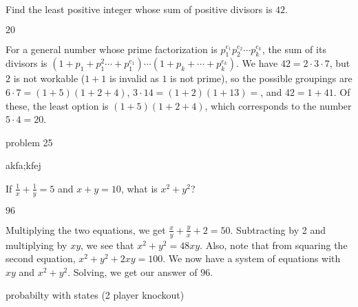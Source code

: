 \documentclass[11pt]{article}
\begin{document}
\begin{problem}
Find the least positive integer whose sum of positive divisors is $42$.
\end{problem}

\begin{answer}
$\boxed{20}$
\end{answer}

\begin{solution}
For a general number whose prime factorization is $p_1^{e_1}p_2^{e_2} \cdots p_k^{e_k}$, the sum of its divisors is $(1 + p_1 + p_1^2 \cdots + p_1^{e_1}) \cdots (1 + p_k + \cdots + p_k^{e_k})$. We have $42 = 2 \cdot 3 \cdot 7$, but $2$ is not workable ($1+1$ is invalid as $1$ is not prime), so the possible groupings are $6 \cdot 7 = (1 + 5)(1 + 2 + 4)$, $3 \cdot 14 = (1 + 2)(1 + 13) = $, and $42 = 1 + 41$. Of these, the least option is $(1+5)(1+2+4)$, which corresponds to the number $5 \cdot 4 = \boxed{20}$.
\end{solution}


\begin{problem}
problem 25
\end{problem}

\begin{answer}

\end{answer}

\begin{solution}
akfa;kfej
\end{solution}


\begin{problem}%
If $\frac{1}{x} + \frac{1}{y} = 5$ and $x+y=10$, what is $x^2+y^2$?
\end{problem}

\begin{answer}
$\boxed{96}$
\end{answer}

\begin{solution}
Multiplying the two equations, we get $\frac{x}{y} + \frac{y}{x} + 2 = 50$. Subtracting by 2 and multiplying by $xy$, we see that $x^2+y^2 = 48xy$. Also, note that from squaring the second equation, $x^2+ y^2 +2xy = 100$. We now have a system of equations with $xy$ and $x^2+y^2$. Solving, we get our answer of $\boxed{96}$.
\end{solution}


\begin{problem}
probabilty with states (2 player knockout)
\end{problem}
\end{document}
